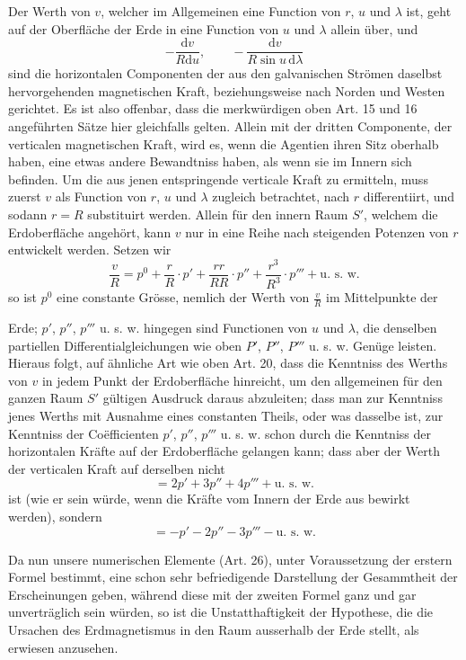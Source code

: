 Der Werth von $v$, welcher im Allgemeinen eine Function von $r$, $u$ und $\lambda$ ist, geht auf der Oberfläche der Erde in eine Function von $u$ und $\lambda$ allein über, und
\[
-\frac{\mathrm dv}{R\mathrm du},\qquad -\frac{\mathrm dv}{R\sin u\,\mathrm d\lambda}
\]
sind die horizontalen Componenten der aus den galvanischen Strömen daselbst hervorgehenden magnetischen Kraft, beziehungsweise nach Norden und Westen gerichtet. Es ist also offenbar, dass die merkwürdigen oben Art. 15 und 16 angeführten Sätze hier gleichfalls gelten. Allein mit der dritten Componente, der verticalen magnetischen Kraft, wird es, wenn die Agentien ihren Sitz oberhalb haben, eine etwas andere Bewandtniss haben, als wenn sie im Innern sich befinden. Um die aus jenen entspringende verticale Kraft zu ermitteln, muss zuerst $v$ als Function von $r$, $u$ und $\lambda$ zugleich betrachtet, nach $r$ differentiirt, und sodann $r=R$ substituirt werden. Allein für den innern Raum $S'$, welchem die Erdoberfläche angehört, kann $v$ nur in eine Reihe nach steigenden Potenzen von $r$ entwickelt werden. Setzen wir
\[
\frac vR=p^0+\frac rR\cdot p'+\frac{rr}{RR}\cdot p''+\frac{r^3}{R^3}\cdot p'''+\text{u. s. w.}
\]
so ist $p^0$ eine constante Grösse, nemlich der Werth von $\frac vR$ im Mittelpunkte der
\par\GaussVTheoryGathering{22\textsuperscript{*}}
\par\clearpage
{}
\noindent Erde; $p'$, $p''$, $p'''$ u. s. w. hingegen sind Functionen von $u$ und $\lambda$, die denselben partiellen Differentialgleichungen wie oben $P'$, $P''$, $P'''$ u. s. w. Genüge leisten. Hieraus folgt, auf ähnliche Art wie oben Art. 20, dass die Kenntniss des Werths von $v$ in jedem Punkt der Erdoberfläche hinreicht, um den allgemeinen für den ganzen Raum $S'$ gültigen Ausdruck daraus abzuleiten; dass man zur Kenntniss jenes Werths mit Ausnahme eines constanten Theils, oder was dasselbe ist, zur Kenntniss der Coëfficienten $p'$, $p''$, $p'''$ u. s. w. schon durch die Kenntniss der horizontalen Kräfte auf der Erdoberfläche gelangen kann; dass aber der Werth der verticalen Kraft auf derselben nicht
\[
=2p'+3p''+4p'''+\text{u. s. w.}
\]
ist (wie er sein würde, wenn die Kräfte vom Innern der Erde aus bewirkt werden), sondern
\[
=-p'-2p''-3p'''-\text{u. s. w.}
\]

Da nun unsere numerischen Elemente (Art. 26), unter Voraussetzung der erstern Formel bestimmt, eine schon sehr befriedigende Darstellung der Gesammtheit der Erscheinungen geben, während diese mit der zweiten Formel ganz und gar unverträglich sein würden, so ist die Unstatthaftigkeit der Hypothese, die die Ursachen des Erdmagnetismus in den Raum ausserhalb der Erde stellt, als erwiesen anzusehen.

